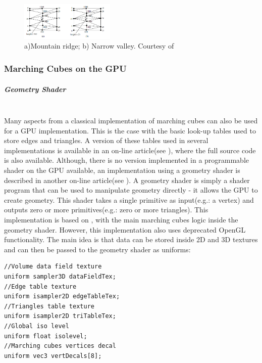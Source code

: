 \documentclass[]{article}
\begin{document}
\begin{appendices}
\begin{figure}[hbtp]
    \centering
    \includegraphics[width=0.4\textwidth]{figures/MountainRidgeNarrowValley.PNG}
    \caption{a)Mountain ridge; b) Narrow valley. Courtesy of \cite[Chapter~9]{berg08}}
    \label{fig:MountainRidgeNarrowValley}
\end{figure}

\subsubsection{Marching Cubes on the GPU}
\label{appendix:B-mc}

\subparagraph{Geometry Shader}\mbox{}\\

Many aspects from a classical implementation of marching cubes can also be used for a GPU implementation. This is the case with the basic look-up tables used to store edges and triangles. A version of these tables used in several implementations is available in an on-line article(see \cite{bourke1994}), where the full source code is also available. Although, there is no version implemented in a programmable shader on the GPU available, an implementation using a geometry shader is described in another on-line article(see \cite{crassin2007}). A geometry shader is simply a shader program that can be used to manipulate geometry directly - it allows the GPU to create geometry. This shader takes a single primitive as input(e.g.: a vertex) and outputs zero or more primitives(e.g.: zero or more triangles). 
This implementation is based on \cite{bourke1994}, with the main marching cubes logic inside the geometry shader. However, this implementation also uses deprecated OpenGL functionality. The main idea is that data can be stored inside 2D and 3D textures and can then be passed to the geometry shader as uniforms:

\begin{verbatim}
//Volume data field texture
uniform sampler3D dataFieldTex;
//Edge table texture
uniform isampler2D edgeTableTex;
//Triangles table texture
uniform isampler2D triTableTex;
//Global iso level
uniform float isolevel;
//Marching cubes vertices decal
uniform vec3 vertDecals[8];
\end{verbatim}


\end{appendices}
\end{document}
